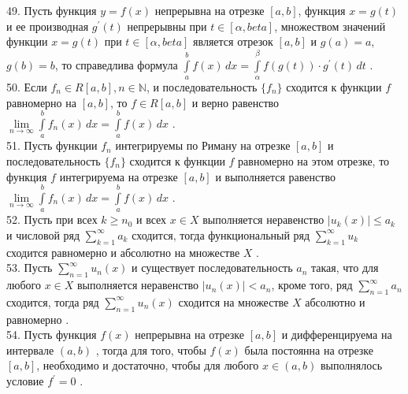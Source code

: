\documentclass[12pt]{article}
\begin{document}
{49. Пусть функция ${\displaystyle y = f(x)}$ непрерывна на отрезке ${\displaystyle [a,b]}$, функция ${\displaystyle x = g(t)}$ и ее производная ${\displaystyle g^{\prime}(t)}$ непрерывны при ${\displaystyle t \in [\alpha,beta]}$, множеством значений функции ${\displaystyle x = g(t)}$ при ${\displaystyle t \in [\alpha,beta]}$ является отрезок ${\displaystyle [a,b]}$ и ${\displaystyle g(a) = a}$, ${\displaystyle g(b) = b}$, то справедлива формула ${\displaystyle \int \limits _{a}^{b} f(x) \, dx=\int \limits _{\alpha}^{\beta} f(g(t))\cdot g^{\prime}(t) \, dt}$ .\\

50. Если ${\displaystyle f_n \in R[a,b], n \in \mathbb{N}}$, и последовательность ${\displaystyle \{f_n\}}$ сходится к функции ${\displaystyle f}$ равномерно на ${\displaystyle [a,b]}$, то ${\displaystyle f \in R[a,b]}$ и верно равенство ${\displaystyle \lim \limits _{n \to \infty} \int \limits _{a}^{b} f_n(x) \, dx=\int \limits _{a}^{b} f(x) \, dx}$ .\\

51. Пусть функции ${\displaystyle f_n}$ интегрируемы по Риману на отрезке ${\displaystyle [a,b]}$ и последовательность ${\displaystyle \{f_n\}}$ сходится к функции ${\displaystyle f}$ равномерно на этом отрезке, то функция ${\displaystyle f}$  интегрируема на отрезке ${\displaystyle [a,b]}$ и выполняется равенство ${\displaystyle \lim \limits _{n \to \infty} \int \limits _{a}^{b} f_n(x) \, dx=\int \limits _{a}^{b} f(x) \, dx}$ .\\

52. Пусть при всех ${k \geq n_0}$ и всех ${x \in X}$ выполняется неравенство ${|u_k(x)| \leq a_k}$ и числовой ряд ${\sum _{k=1}^{\infty} a_k}$ сходится, тогда функциональный ряд ${\sum _{k=1}^{\infty} u_k}$ сходится равномерно и абсолютно на множестве ${\displaystyle X}$ .\\

53. Пусть ${\sum _{{n=1}}^{{\infty }} u_{n}(x)}$ и существует последовательность ${\displaystyle a_{n}}$ такая, что для любого ${\displaystyle x\in X}$  выполняется неравенство ${\displaystyle |u_{n}(x)|<a_{n}}$, кроме того, ряд ${\displaystyle \sum _{n=1}^{\infty }a_{n}}$ сходится, тогда ряд ${\displaystyle \sum _{n=1}^{\infty } u_{n}(x)}$ сходится на множестве ${\displaystyle X}$ абсолютно и равномерно .\\

54. Пусть функция ${\displaystyle f(x)}$ непрерывна на отрезке  ${\displaystyle [a,b]}$ и дифференцируема на интервале ${\displaystyle (a,b)}$ , тогда для того, чтобы ${\displaystyle f(x)}$ была постоянна на отрезке ${\displaystyle [a,b]}$, необходимо и достаточно, чтобы для любого ${\displaystyle x \in (a,b)}$ выполнялось условие ${\displaystyle f^{\prime}=0}$ .\\

}
\end{document}

